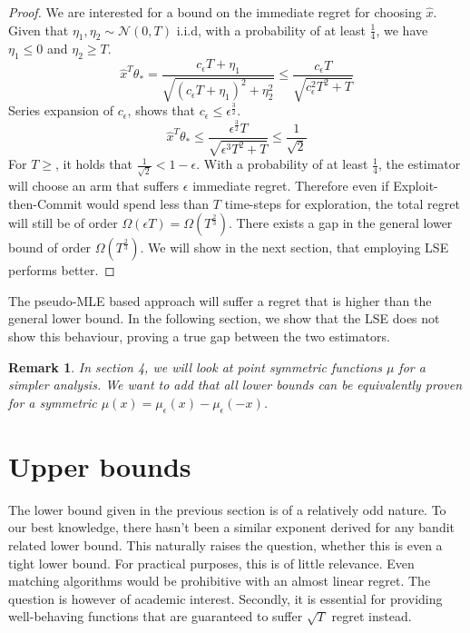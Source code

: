 \documentclass[twoside]{article} \usepackage{aistats2017}
\newtheorem{remark}{Remark}
\begin{document}
\begin{proof}
    We are interested for a bound on the immediate regret for choosing $\hat{x}$. Given that $\eta_1,\eta_2\sim \mathcal{N}(0,T)$ i.i.d, with a probability of at least $\frac{1}{4}$, we have $\eta_1\leq0$ and $\eta_2 \geq T$.
    $$
    \hat{x}^T\theta_* = \frac{c_\epsilon T+\eta_1}{\sqrt{(c_\epsilon T+\eta_1)^2+\eta_2^2}}\leq \frac{c_\epsilon T}{\sqrt{c^2_\epsilon T^2 + T}}
    $$
    Series expansion of $c_\epsilon$, shows that $c_\epsilon\leq\epsilon^{\frac{3}{2}}$.
    $$
    \hat{x}^T\theta_*\leq \frac{\epsilon^{\frac{3}{2}}T}{\sqrt{\epsilon^3T^2+T}}\leq \frac{1}{\sqrt{2}}
    $$
    For $T\geq $, it holds that $\frac{1}{\sqrt{2}}<1-\epsilon$. With a probability of at least $\frac{1}{4}$, the estimator will choose an arm that suffers $\epsilon$ immediate regret. Therefore even if Exploit-then-Commit would spend less than $T$ time-steps for exploration, the total regret will still be of order $\Omega(\epsilon T)=\Omega (T^{\frac{2}{3}})$. There exists a gap in the general lower bound of order $\Omega (T^{\frac{2}{3}})$. We will show in the next section, that employing LSE performs better.
    
    
    
    
\end{proof}

The pseudo-MLE based approach will suffer a regret that is higher than the general lower bound. In the following section, we show that the LSE does not show this behaviour, proving a true gap between the two estimators.
\begin{remark}
In section 4, we will look at point symmetric functions $\mu$ for a simpler analysis. We want to add that all lower bounds can be equivalently proven for a symmetric $\mu(x) = \mu_\epsilon(x)-\mu_\epsilon(-x)$.
\end{remark}
\section{Upper bounds}\label{upperBounds}
The lower bound given in the previous section is of a relatively odd nature. 
To our best knowledge, there hasn't been a similar exponent derived for any bandit related lower bound.
This naturally raises the question, whether this is even a tight lower bound.
For practical purposes, this is of little relevance. Even matching algorithms would be prohibitive with an almost linear regret. The question is however of academic interest.
Secondly, it is essential for providing well-behaving functions that are guaranteed to suffer $\sqrt{T}$ regret instead.
\end{document}
